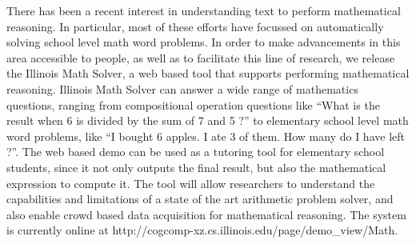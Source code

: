 There has been a recent interest in understanding text to perform mathematical reasoning. In particular, most of these efforts have focussed on automatically solving school level math word problems. In order to make advancements in this area accessible to people, as well as to facilitate this line of research, we release the Illinois Math Solver, a web based tool that supports performing mathematical reasoning. Illinois Math Solver can answer a wide range of mathematics questions, ranging from compositional operation questions like ``What is the result when 6 is divided by the sum of 7 and 5 ?''  to elementary school level math word problems, like ``I bought 6 apples. I ate 3 of them. How many do I have left ?''. The web based demo can be used as a tutoring tool for elementary school students, since it not only outputs the final result, but also the mathematical expression to compute it. The tool will allow researchers to understand the capabilities and limitations of a state of the art arithmetic problem solver, and also enable crowd based data acquisition for mathematical reasoning.  The system is currently online at http://cogcomp-xz.cs.illinois.edu/page/demo\_view/Math.
